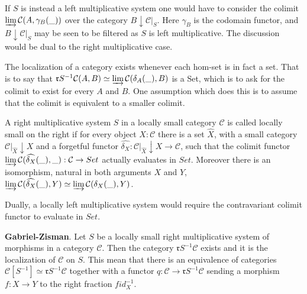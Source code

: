     If $S$ is instead a left multiplicative system one would have to consider the colimit $\varinjlim \mathcal{C}(A,\gamma_B(\_))$ over the category $B\downarrow \mathcal{C}|_{S}$. Here $\gamma_B$ is the codomain functor, and $B\downarrow \mathcal{C}|_{S}$ may be seen to be filtered as $S$ is left multiplicative. The discussion would be dual to the right multiplicative case.
 
    The localization of a category exists whenever each hom-set is in fact a set. That is to say that $\mathfrak{r}S^{-1}\mathcal{C}(A,B)\simeq\varinjlim\mathcal{C}(\delta_A(\_),B)$ is a Set, which is to ask for the colimit to exist for every $A$ and $B$. One assumption which does this is to assume that the colimit is equivalent to a smaller colimit.

    \begin{definition}
        A right multiplicative system $S$ in a locally small category $\mathcal{C}$ is called locally small on the right if for every object $X:\mathcal{C}$ there is a set $\widehat{X}$, with a small category $\mathcal{C}|_{\widehat{X}}\downarrow X$ and a forgetful functor $\widehat{\delta_X} : \mathcal{C}|_{\widehat{X}}\downarrow X \rightarrow \mathcal{C}$, such that the colimit functor $\varinjlim\mathcal{C}(\widehat{\delta_X}(\_),\_) : \mathcal{C} \rightarrow Set$ actually evaluates in $Set$. Moreover there is an isomorphism, natural in both arguments $X$ and $Y$, $\varinjlim\mathcal{C}(\widehat{\delta_X}(\_),Y)\simeq\varinjlim\mathcal{C}(\delta_X(\_),Y)$.

        Dually, a locally left multiplicative system would require the contravariant colimit functor to evaluate in $Set$.
    \end{definition}

    \begin{theorem}
        \textbf{Gabriel-Zisman}. Let $S$ be a locally small right multiplicative system of morphisms in a category $\mathcal{C}$. Then the category $\mathfrak{r}S^{-1}\mathcal{C}$ exists and it is the localization of $\mathcal{C}$ on $S$. This mean that there is an equivalence of categories $\mathcal{C}[S^{-1}]\simeq\mathfrak{r}S^{-1}\mathcal{C}$ together with a functor $q: \mathcal{C}\rightarrow\mathfrak{r}S^{-1}\mathcal{C}$ sending a morphism $f : X\rightarrow Y$ to the right fraction $fid_X^{-1}$.
    \end{theorem}

